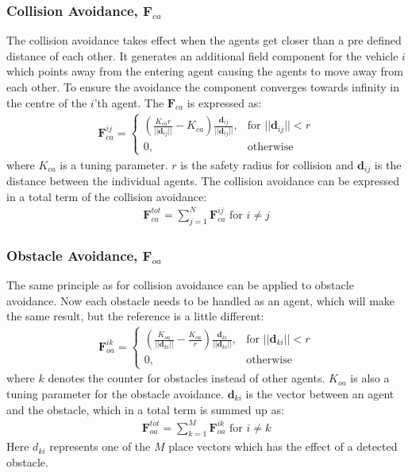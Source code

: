 \documentclass[conference]{IEEEtran}
\begin{document}
\subsubsection{Collision Avoidance, $\mathbf{F}_{ca}$}
The collision avoidance takes effect when the agents get closer than a
pre defined distance of each other. It generates an additional field
component for the vehicle $i$ which points away from the entering
agent causing the agents to move away from each other. To ensure the
avoidance the component converges towards infinity in the centre of
the $i$'th agent. The $\mathbf{F}_{ca}$ is expressed as:
\begin{align}
    \mathbf{F}_{ca}^{ij}= 
\begin{cases}
		\left(
    \frac{K_{ca}r}{||\mathbf{d}_{ij}||}-K_{ca}
		\right)
		\frac{\mathbf{d}_{ij}}{||\mathbf{d}_{ij}||}
		,& \text{for } ||\mathbf{d}_{ij}||<r\\
    0,              & \text{otherwise}
\end{cases}
\end{align}
where $K_{ca}$ is a tuning parameter. $r$ is the safety radius for
collision and $\mathbf{d}_{ij}$ is the distance between the individual agents.
The collision avoidance can be expressed in a total term of the
collision avoidance:
\begin{align}
\mathbf{F}_{ca}^{tot} = \sum\limits_{j=1}^N\mathbf{F}_{ca}^{ij} \text{ for } i\neq j
\end{align}

\subsubsection{Obstacle Avoidance, $\mathbf{F}_{oa}$}
The same principle as for collision avoidance can be applied to
obstacle avoidance. Now each obstacle needs to be handled as an agent,
which will make the same result, but the reference is a little
different:
\begin{align}
    \mathbf{F}_{oa}^{ik}= 
\begin{cases}
    \left( \frac{K_{oa}}{||\mathbf{d}_{ki}||}-\frac{K_{oa}}{r}\right)
		\frac{\mathbf{d}_{{ki}}}{||\mathbf{d}_{ki}||},& \text{for } ||\mathbf{d}_{ki}||<r\\
    0,              & \text{otherwise}
\end{cases}
\end{align}
where $k$ denotes the counter for obstacles instead of other agents.
$K_{oa}$ is also a tuning parameter for the obstacle avoidance.
$\mathbf{d}_{ki}$ is the vector between an agent and the obstacle, which in a
total term is summed up as:
\begin{align}
\mathbf{F}_{oa}^{tot} = \sum\limits_{k=1}^M\mathbf{F}_{oa}^{ik} \text{ for } i\neq k
\end{align}
Here $d_{ki}$ represents one of the $M$ place vectors which has the
effect of a detected obstacle.
\end{document}
